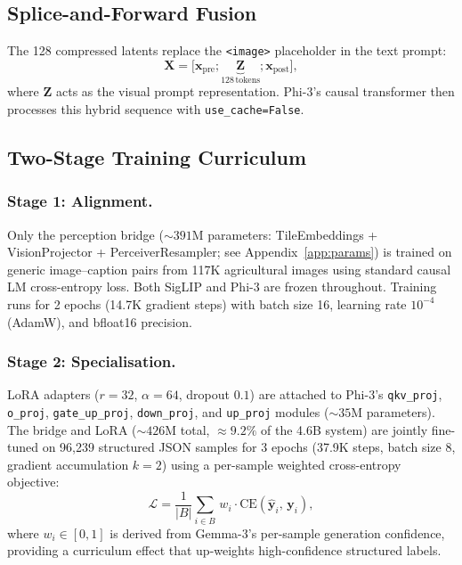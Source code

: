 \documentclass[runningheads]{llncs}
\begin{document}
\subsection{Splice-and-Forward Fusion}

The 128 compressed latents replace the \texttt{<image>} placeholder
in the text prompt:
\begin{equation}
  \mathbf{X} = \bigl[\mathbf{x}_{\text{pre}};
  \underbrace{\mathbf{Z}}_{128\,\text{tokens}};
  \mathbf{x}_{\text{post}}\bigr],
  \label{eq:splice}
\end{equation}
where $\mathbf{Z}$ acts as the visual prompt representation. Phi-3's causal transformer then processes this hybrid sequence with \texttt{use\_cache=False}.

\subsection{Two-Stage Training Curriculum}

\subsubsection{Stage 1: Alignment.}
Only the perception bridge (${\sim}391$M parameters:
TileEmbeddings + VisionProjector + PerceiverResampler; see Appendix~\ref{app:params}) is trained
on generic image--caption pairs from 117K agricultural images using
standard causal LM cross-entropy loss.
Both SigLIP and Phi-3 are frozen throughout.
Training runs for 2 epochs (14.7K gradient steps) with batch size 16,
learning rate $10^{-4}$ (AdamW), and bfloat16 precision.

\subsubsection{Stage 2: Specialisation.}
LoRA adapters ($r{=}32$, $\alpha{=}64$, dropout $0.1$) are attached to
Phi-3's \texttt{qkv\_proj}, \texttt{o\_proj}, \texttt{gate\_up\_proj},
\texttt{down\_proj}, and \texttt{up\_proj} modules (${\sim}35$M
parameters).
The bridge and LoRA (${\sim}426$M total, ${\approx}9.2\%$ of the 4.6B
system) are jointly fine-tuned on 96,239 structured JSON samples for 3 epochs
(37.9K steps, batch size 8, gradient accumulation $k{=}2$) using a
per-sample weighted cross-entropy objective:
\begin{equation}
  \mathcal{L} =
  \frac{1}{|B|} \sum_{i \in B}\, w_i \cdot
  \mathrm{CE}(\hat{\mathbf{y}}_i,\, \mathbf{y}_i),
  \label{eq:loss}
\end{equation}
where $w_i \in [0,1]$ is derived from Gemma-3's per-sample generation
confidence, providing a curriculum effect that up-weights
high-confidence structured labels.
\end{document}
